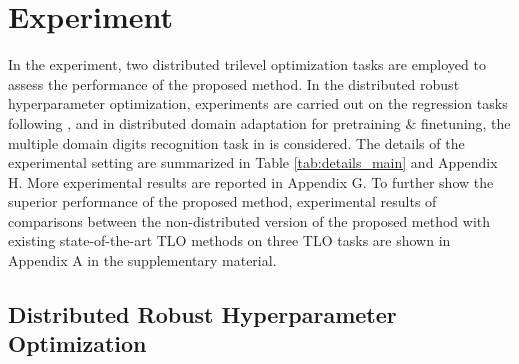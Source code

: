 \documentclass[letterpaper]{article} %
\begin{document}
\section{Experiment}

In the experiment, two distributed trilevel optimization tasks are employed to assess the performance of the proposed method. In the distributed robust hyperparameter optimization, experiments are carried out on the regression tasks  following \cite{sato2021gradient}, and in distributed domain adaptation for pretraining $\&$ finetuning, the multiple domain digits recognition task in \cite{qian2019robust,wang2021discriminative} is considered. The details of the experimental setting are summarized in Table \ref{tab:details_main} and Appendix H. More experimental results are reported in Appendix G. To further show the superior performance of the proposed method, experimental results of comparisons between the non-distributed version of the proposed method with existing state-of-the-art TLO methods \cite{sato2021gradient,choe2022betty} on three TLO tasks are shown in Appendix A in the supplementary material.



\subsection{Distributed Robust Hyperparameter Optimization}
\end{document}
